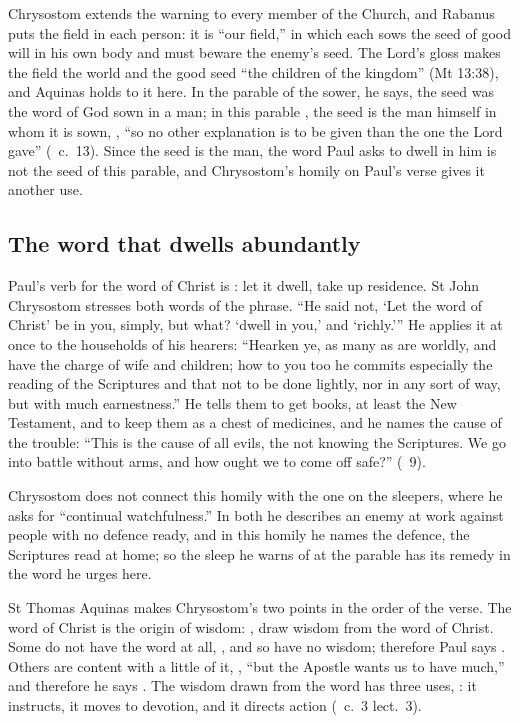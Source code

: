 Chrysostom extends the warning to every member of the Church, and Rabanus
puts the field in each person: it is ``our field,'' in which each sows the
seed of good will in his own body and must beware the enemy's seed. The Lord's
gloss makes the field the world and the good seed ``the children of the
kingdom'' (Mt 13:38), and Aquinas holds to it here. In the parable of the
sower, he says, the seed was the word of God sown in a man; in this parable
, the seed is the man himself in
whom it is sown, , ``so no other explanation is to be given than the one the
Lord gave'' (\ c.~13). Since the seed is the man, the word
Paul asks to dwell in him is not the seed of this parable, and Chrysostom's
homily on Paul's verse gives it another use.

\subsection{The word that dwells abundantly}
\label{sec:heart-word}

Paul's verb for the word of Christ is : let it dwell, take up
residence. St John Chrysostom stresses both words of the phrase. ``He
said not, `Let the word of Christ' be in you, simply, but what? `dwell in
you,' and `richly.''' He applies it at once to the households of his hearers:
``Hearken ye, as many as are worldly, and have the charge of wife and
children; how to you too he commits especially the reading of the Scriptures
and that not to be done lightly, nor in any sort of way, but with much
earnestness.'' He tells them to get books, at least the New Testament, and to
keep them as a chest of medicines, and he names the cause of the trouble:
``This is the cause of all evils, the not knowing the Scriptures. We go into
battle without arms, and how ought we to come off safe?'' (\ 9).

Chrysostom does not connect this homily with the one on the sleepers, where
he asks for ``continual watchfulness.'' In both he describes an enemy at
work against people with no defence ready, and in this homily he names the
defence, the Scriptures read at home; so the sleep he warns of at the parable
has its remedy in the word he urges here.

St Thomas Aquinas makes Chrysostom's two points in the order of the verse. The
word of Christ is the origin of wisdom: , draw wisdom from the word of Christ. Some do not have the word at all,
, and so have no wisdom; therefore Paul says
. Others are content with a little of it, , ``but the Apostle wants us to have much,'' and
therefore he says . The wisdom drawn from the word has
three uses, : it instructs, it moves to
devotion, and it directs action (\ c.~3 lect.~3).

